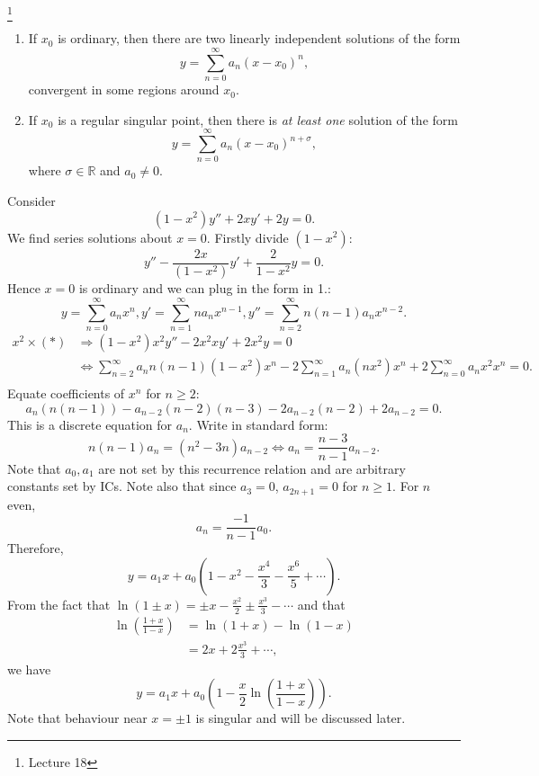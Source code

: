 \documentclass[a4paper]{article}
\begin{document}
    \begin{theorem}[Fuch]\label{thm:Fuch}\footnote{Lecture 18}
       \begin{enumerate}
           \item If $x_0$ is ordinary, then there are two linearly independent solutions of the form
           \[
               y=\sum_{n=0}^{\infty} a_n (x-x_0)^n
           ,\]
           convergent in some regions around $x_0$.
           \item If $x_0$ is a regular singular point, then there is \textit{at least one} solution of the form 
           \[
               y=\sum_{n=0}^{\infty}a_n(x-x_0)^{n+\sigma}
           ,\]
           where $ \sigma\in \mathbb{R} $ and $a_0\neq 0$.
       \end{enumerate} 
    \end{theorem}
    \begin{example}
        Consider 
        \[
            (1-x^2)y''+2xy'+2y=0\tag{$*$}
        .\]
        We find series solutions about $x=0$. Firstly divide $(1-x^2)$:
        \[
            y''-\frac{2x}{(1-x^2)}y'+\frac{2}{1-x^2}y=0
        .\]
        Hence $x=0$ is ordinary and we can plug in the form in 1.:
        \[
            y=\sum_{n=0}^{\infty}a_n x^n, y'=\sum_{n=1}^{\infty} na_nx^{n-1}, y''=\sum_{n=2}^{\infty }n(n-1)a_nx^{n-2}
        .\]
        \[
            \begin{aligned}
                x^2 \times (*) &\Longrightarrow (1-x^2)x^2y''-2x^2xy'+2x^2y=0\\
                &\Longleftrightarrow \sum_{n=2}^{\infty}a_nn(n-1)(1-x^2)x^n-2 \sum_{n=1}^{\infty}a_n(nx^2)x^n+2 \sum_{n=0}^{\infty}a_n x^2x^{n}=0.\\
            \end{aligned}
        \]
        Equate coefficients of $x^n$ for $n\ge 2$:
        \[
            a_n(n(n-1))-a_{n-2}(n-2)(n-3)-2a_{n-2}(n-2)+2a_{n-2}=0
        .\]
        This is a discrete equation for $a_n$. Write in standard form:
        \[
            n(n-1)a_n=(n^2-3n)a_{n-2} \Longleftrightarrow a_n = \frac{n-3}{n-1}a_{n-2}
        .\]
        Note that $a_0,a_1$ are not set by this recurrence relation and are arbitrary constants set by ICs. Note also that since $a_3=0$, $a_{2n+1}=0$ for $n\ge 1$. For $n$ even, 
        \[
            a_n=\frac{-1}{n-1}a_0
        .\]
        Therefore,
        \[
            y=a_1x+a_0\left( 1-x^2-\frac{x^4}{3}-\frac{x^6}{5}+\cdots \right)
        .\]
        From the fact that $ \ln (1\pm x) = \pm x-\frac{x^2}{2}\pm \frac{x^3}{3}-\cdots $ and that
        \[
            \begin{aligned}
                 \ln \left( \frac{1+x}{1-x} \right)&= \ln (1+x)-\ln (1-x)\\
                &= 2x+2\frac{x^3}{3}+\cdots,
            \end{aligned}
        \]
        we have 
        \[
            y=a_1 x+a_0\left( 1-\frac{x}{2}\ln \left( \frac{1+x}{1-x} \right) \right)
        .\]
        Note that behaviour near $x=\pm 1$ is singular and will be discussed  later.
    \end{example}
\end{document}
